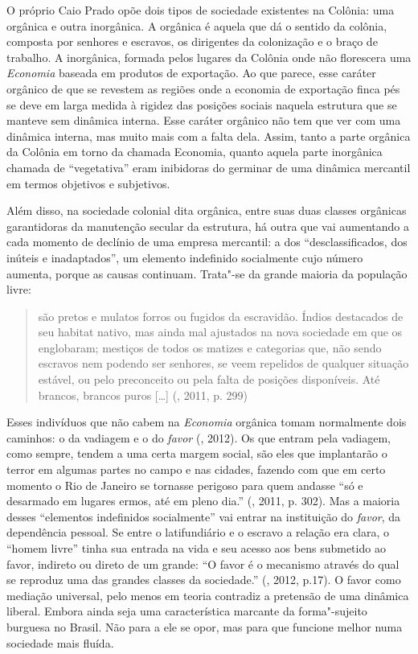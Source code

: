{O próprio Caio Prado opõe dois tipos de sociedade existentes na Colônia:
uma orgânica e outra inorgânica. A orgânica é aquela que dá o sentido da
colônia, composta por senhores e escravos, os dirigentes da colonização
e o braço de trabalho. A inorgânica, formada pelos lugares da Colônia
onde não florescera uma \emph{Economia} baseada em produtos de
exportação. Ao que parece, esse caráter orgânico de que se revestem as
regiões onde a economia de exportação finca pés se deve em larga medida
à rigidez das posições sociais naquela estrutura que se manteve sem
dinâmica interna. Esse caráter orgânico não tem que ver com uma dinâmica
interna, mas muito mais com a falta dela. Assim, tanto a parte orgânica
da Colônia em torno da chamada Economia, quanto aquela parte inorgânica
chamada de ``vegetativa'' eram inibidoras do germinar de uma dinâmica
mercantil em termos objetivos e subjetivos.

Além disso, na sociedade colonial dita orgânica, entre suas duas classes
orgânicas garantidoras da manutenção secular da estrutura, há outra que
vai aumentando a cada momento de declínio de uma empresa mercantil: a
dos ``desclassificados, dos inúteis e inadaptados'', um elemento
indefinido socialmente cujo número aumenta, porque as causas continuam.
Trata"-se da grande maioria da população livre:

\begin{quote}
são pretos e mulatos forros ou fugidos da escravidão. Índios destacados
de seu habitat nativo, mas ainda mal ajustados na nova sociedade em que
os englobaram; mestiços de todos os matizes e categorias que, não sendo
escravos nem podendo ser senhores, se veem repelidos de qualquer
situação estável, ou pelo preconceito ou pela falta de posições
disponíveis. Até brancos, brancos puros [\ldots{}] (, 2011, p.
299)
\end{quote}

Esses
indivíduos que não cabem na \emph{Economia} orgânica tomam normalmente
dois caminhos: o da vadiagem e o do \emph{favor} (, 2012). Os que
entram pela vadiagem, como sempre, tendem a uma certa margem social, são
eles que implantarão o terror em algumas partes no campo e nas cidades,
fazendo com que em certo momento o Rio de Janeiro se tornasse perigoso
para quem andasse ``só e desarmado em lugares ermos, até em pleno dia.''
(, 2011, p. 302). Mas a maioria desses ``elementos indefinidos
socialmente'' vai entrar na instituição do \emph{favor}, da dependência
pessoal. Se entre o latifundiário e o escravo a relação era clara, o
``homem livre'' tinha sua entrada na vida e seu acesso aos bens
submetido ao favor, indireto ou direto de um grande: ``O favor é o
mecanismo através do qual se reproduz uma das grandes classes da
sociedade.'' (, 2012, p.17). O favor como mediação universal,
pelo menos em teoria contradiz a pretensão de uma dinâmica liberal.
Embora ainda seja uma característica marcante da forma"-sujeito burguesa
no Brasil. Não para a ele se opor, mas para que funcione melhor numa
sociedade mais fluída.

}
